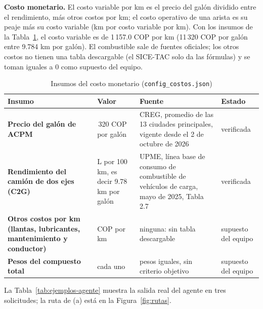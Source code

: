 \documentclass[12pt,a4paper]{article}
\begin{document}
\textbf{Costo monetario.} El costo variable por km es el precio del galón
dividido entre el rendimiento, más otros costos por km; el costo operativo de
una arista es su peaje más su costo variable (km por costo variable por km).
Con los insumos de la Tabla~\ref{tab:insumos}, el costo variable es de
1\,157.0 COP por km (11\,320 COP por galón entre 9.784 km por galón). El combustible sale de fuentes
oficiales; los otros costos no tienen una tabla descargable (el SICE-TAC solo
da las fórmulas) y se toman iguales a 0 como supuesto del equipo.

\begin{table}[H]
\centering
\caption{Insumos del costo monetario (\texttt{config\_costos.json})}
\label{tab:insumos}
\footnotesize
\renewcommand{\arraystretch}{1.2}
\begin{tabular}{|>{\raggedright\arraybackslash}p{3.2cm}|>{\raggedright\arraybackslash}p{2.6cm}|>{\raggedright\arraybackslash}p{5.2cm}|>{\raggedright\arraybackslash}p{2.2cm}|}
\hline
\rowcolor{gray!20} \textbf{Insumo} & \textbf{Valor} & \textbf{Fuente} & \textbf{Estado} \\
\hline
\textbf{Precio del galón de ACPM} & 11\,320 COP por galón & CREG, promedio de las 13 ciudades principales, vigente desde el 2 de octubre de 2026 & verificada \\
\hline
\textbf{Rendimiento del camión de dos ejes (C2G)} & 38.69 L por 100 km, es decir 9.78 km por galón & UPME, línea base de consumo de combustible de vehículos de carga, mayo de 2025, Tabla 2.7 & verificada \\
\hline
\textbf{Otros costos por km (llantas, lubricantes, mantenimiento y conductor)} & 0 COP por km & ninguna: sin tabla descargable & supuesto del equipo \\
\hline
\textbf{Pesos del compuesto total} & 0.25 cada uno & pesos iguales, sin criterio objetivo & supuesto del equipo \\
\hline
\end{tabular}
\end{table}
La Tabla~\ref{tab:ejemplos-agente} muestra la salida real del agente en tres
solicitudes; la ruta de (a) está en la Figura~\ref{fig:rutas}.

\begin{table}[H]
\centering
\caption{Salida del agente autónomo en tres solicitudes: (a) un par que cruza
el ciclo, (b) un par de ruta única y (c) varios destinos con regreso}
\label{tab:ejemplos-agente}
\scriptsize\setlength{\tabcolsep}{3pt}


\end{table}
\end{document}
